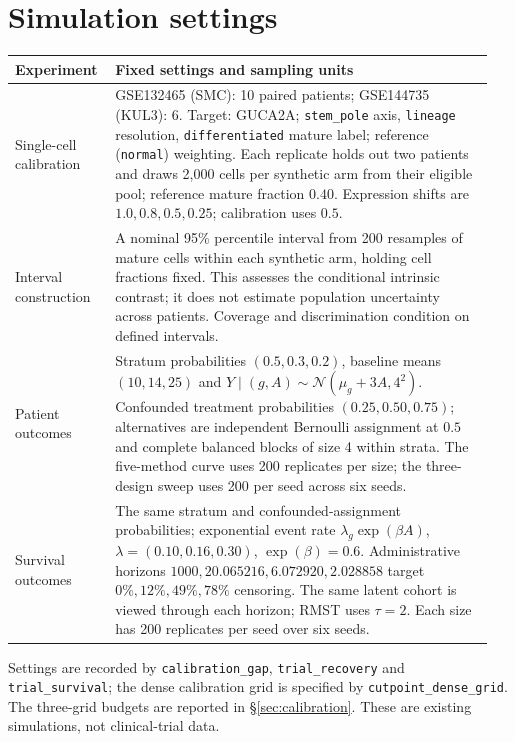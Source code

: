 \section{Simulation settings}
\label{app:methods}
\begin{center}
\small
\begin{tabular}{@{}p{0.19\linewidth}p{0.76\linewidth}@{}}
\toprule
\textbf{Experiment} & \textbf{Fixed settings and sampling units} \\
\midrule
Single-cell calibration &
GSE132465 (SMC): 10 paired patients; GSE144735 (KUL3): 6.
Target: GUCA2A; \texttt{stem\_pole} axis, \texttt{lineage} resolution,
\texttt{differentiated} mature label; reference (\texttt{normal}) weighting.
Each replicate holds out two patients and draws 2{,}000 cells per synthetic
arm from their eligible pool; reference mature fraction $0.40$.
Expression shifts are $1.0,0.8,0.5,0.25$; calibration uses $0.5$. \\
Interval construction &
A nominal 95\% percentile interval from 200 resamples of mature cells
within each synthetic arm, holding cell fractions fixed. This assesses the
conditional intrinsic contrast; it does not estimate population uncertainty
across patients. Coverage and discrimination condition on defined intervals. \\
Patient outcomes &
Stratum probabilities $(0.5,0.3,0.2)$, baseline means $(10,14,25)$ and
$Y\mid(g,A)\sim\mathcal N(\mu_g+3A,4^2)$.
Confounded treatment probabilities $(0.25,0.50,0.75)$; alternatives are
independent Bernoulli assignment at $0.5$ and complete balanced blocks of size 4
within strata. The five-method curve uses 200 replicates per size; the
three-design sweep uses 200 per seed across six seeds. \\
Survival outcomes &
The same stratum and confounded-assignment probabilities; exponential event
rate $\lambda_g\exp(\beta A)$, $\lambda=(0.10,0.16,0.30)$, $\exp(\beta)=0.6$.
Administrative horizons $1000,20.065216,6.072920,2.028858$ target
$0\%,12\%,49\%,78\%$ censoring. The same latent cohort is viewed through
each horizon; RMST uses $\tau=2$. Each size has 200 replicates per seed over
six seeds. \\
\bottomrule
\end{tabular}
\end{center}
Settings are recorded by \texttt{calibration\_gap}, \texttt{trial\_recovery}
and \texttt{trial\_survival}; the dense calibration grid is specified by
\texttt{cutpoint\_dense\_grid}. The three-grid budgets are reported in
\S\ref{sec:calibration}. These are existing simulations, not clinical-trial data.
